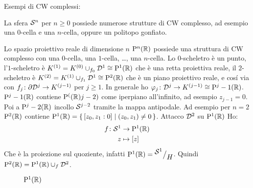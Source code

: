 Esempi di CW complessi:
\begin{example}
  La sfera $ \mathcal{S}^{n} $ per $ n \geq 0 $ possiede numerose strutture di CW complesso,
  ad esempio una $ 0 $-cella e una $ n $-cella, oppure un politopo gonfiato.
\end{example}
\begin{example}
  Lo spazio proiettivo reale di dimensione $ n $ $ \mathrm{P}^n (\mathbb{R}) $ possiede una struttura
  di CW complesso con una $ 0 $-cella, una $ 1 $-cella, \dots, una $ n $-cella. Lo
  $ 0 $-scheletro è un punto, l'$ 1 $-scheletro è $ K^{(1)} = K^{(0)} \cup_{f_0} \mathcal{D}^{1} \cong \mathrm{P}^1 (\mathbb{R}) $
  che è una retta proiettiva reale, il $ 2 $-scheletro è $ K^{(2)} = K^{(1)} \cup_{f_1} \mathcal{D}^{1} \cong \mathrm{P}^2 (\mathbb{R}) $
  che è un piano proiettivo reale, e cosí via con $ f_j \colon \partial \mathcal{D}^{j} \to K^{(j-1)} $ per $ j \geq 1 $.
  In generale ho $ \varphi_j \colon \mathcal{D}^{j} \to K^{(j-1)} \cong \mathrm{P}^j-1 (\mathbb{R}) $. $ \mathrm{P}^j-1 (\mathbb{R}) $ contiene
  $ \mathrm{P}^( (\mathbb{R})j-2) $ come iperpiano all'infinito, ad esempio $ z_{j-1} = 0 $. Poi a $ \mathrm{P}^j-2 (\mathbb{R}) $ incollo
  $ \mathcal{S}^{j-2} $ tramite la mappa antipodale. Ad esempio per $ n = 2 $ $ \mathrm{P}^2 (\mathbb{R}) $ contiene
  $ \mathrm{P}^1 (\mathbb{R}) = \set{ [z_0, z_1 : 0] | (z_0, z_1) \not = 0 } $. Attacco $ \mathcal{D}^{2} $ su $ \mathrm{P}^1 (\mathbb{R}) $
  Ho:
  \begin{align*}
    f \colon \mathcal{S}^{1} & \to \mathrm{P}^1 (\mathbb{R}) \\
    z & \mapsto [z]
  \end{align*}
  Che è la proiezione sul quoziente, infatti $ \mathrm{P}^1 (\mathbb{R}) = {^{\textstyle \mathcal{S}^{1}}\big/_{\textstyle H}} $. Quindi
  $ \mathrm{P}^2 (\mathbb{R}) = \mathrm{P}^1 (\mathbb{R}) \cup_f \mathcal{D}^{2} $.
  \begin{figure}[htbp]
    \centering
    \caption{$ \mathrm{P}^1 (\mathbb{R}) $}
    \label{fig:lez10:projective}
  \end{figure}
\end{example}

